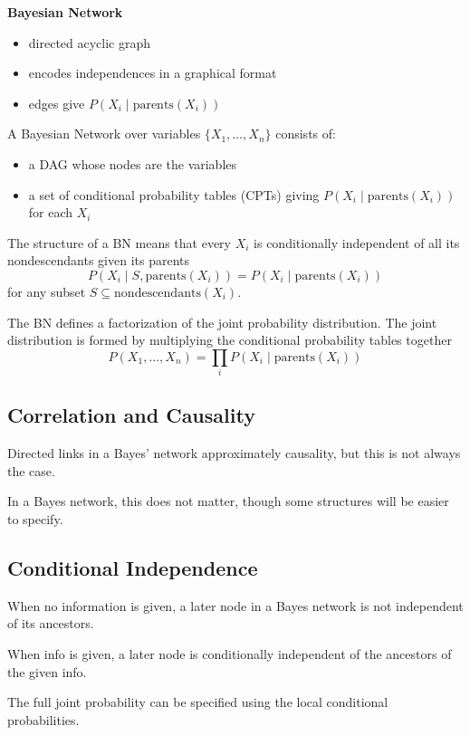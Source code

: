 \documentclass[11pt]{article}
\begin{document}
\textbf{Bayesian Network}
\begin{itemize}
\item directed acyclic graph
\item encodes independences in a graphical format
\item edges give \(P(X_{i} \mid \text{parents}(X_{i}))\)
\end{itemize}

A Bayesian Network over variables \(\{ X_{1}, \dots, X_{n} \}\) consists of:
\begin{itemize}
\item a DAG whose nodes are the variables
\item a set of conditional probability tables (CPTs) giving \(P(X_{i} \mid \text{parents}(X_{i}))\)
for each \(X_{i}\)
\end{itemize}

The structure of a BN means that
every \(X_{i}\) is conditionally independent of all its nondescendants given its parents
$$ P(X_{i} \mid S, \text{parents}(X_{i})) = P(X_{i} \mid \text{parents}(X_{i})) $$
for any subset \(S \subseteq \text{nondescendants}(X_{i})\).

The BN defines a factorization of the joint probability distribution.
The joint distribution is formed by multiplying the conditional probability tables together
$$ P(X_{1}, \dots, X_{n}) = \prod_{i} P(X_{i} \mid \text{parents}(X_{i})) $$
\subsection{Correlation and Causality}
\label{sec:orgc25c1a1}
Directed links in a Bayes' network approximately causality, but this is not always the case.

In a Bayes network, this does not matter, though some structures will be easier to specify.
\subsection{Conditional Independence}
\label{sec:org2039f4c}
When no information is given, a later node in a Bayes network is not independent of its
ancestors.

When info is given, a later node is conditionally independent of the ancestors of the given info.

The full joint probability can be specified using the local conditional probabilities.
\end{document}
